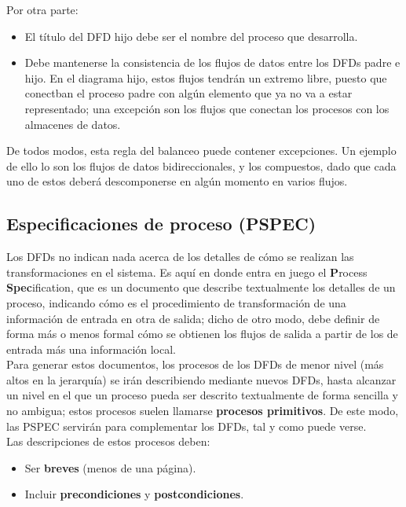 Por otra parte:

\begin{itemize}
\item El título del DFD hijo debe ser el nombre del proceso que desarrolla.
\item Debe mantenerse la consistencia de los flujos de datos entre los DFDs padre e hijo. En el diagrama hijo, estos flujos tendrán un extremo libre, puesto que conectban el proceso padre con algún elemento que ya no va a estar representado; una excepción son los flujos que conectan los procesos con los almacenes de datos.
\end{itemize}

De todos modos, esta regla del balanceo puede contener excepciones. Un ejemplo de ello lo son los flujos de datos bidireccionales, y los compuestos, dado que cada uno de estos deberá descomponerse en algún momento en varios flujos.

\subsection{Especificaciones de proceso (PSPEC)}

Los DFDs no indican nada acerca de los detalles de cómo se realizan las transformaciones en el sistema. Es aquí en donde entra en juego el \textbf{P}rocess \textbf{Spec}ification, que es un documento que describe textualmente los detalles de un proceso, indicando cómo es el procedimiento de transformación de una información de entrada en otra de salida; dicho de otro modo, debe definir de forma más o menos formal cómo se obtienen los flujos de salida a partir de los de entrada más una información local.\\

Para generar estos documentos, los procesos de los DFDs de menor nivel (más altos en la jerarquía) se irán describiendo mediante nuevos DFDs, hasta alcanzar un nivel en el que un proceso pueda ser descrito textualmente de forma sencilla y no ambigua; estos procesos suelen llamarse \textbf{procesos primitivos}. De este modo, las PSPEC servirán para complementar los DFDs, tal y como puede verse.\\

Las descripciones de estos procesos deben:

\begin{itemize}
    \item Ser \textbf{breves} (menos de una página).
    \item Incluir \textbf{precondiciones} y \textbf{postcondiciones}.
\end{itemize}

